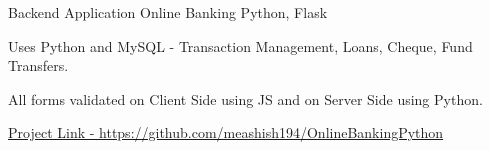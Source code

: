 \begin{cventries}
  \cventry
    {Backend Application} %
    {Online Banking} %
    {Python, Flask} %
    {} %
    {
      \begin{cvitems} %
        \item {Uses Python and MySQL - Transaction Management, Loans, Cheque, Fund Transfers.}
        \item {All forms validated on Client Side using JS and on Server Side using Python.}
        \item {\href{https://github.com/meashis194/OnlineBankingPython}{Project Link - https://github.com/meashish194/OnlineBankingPython}}
      \end{cvitems}
    }


    
\end{cventries}